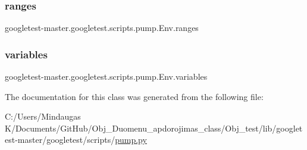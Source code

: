 \subsubsection{\texorpdfstring{ranges}{ranges}}
{\footnotesize\ttfamily googletest-\/master.\+googletest.\+scripts.\+pump.\+Env.\+ranges}

\mbox{\label{classgoogletest-master_1_1googletest_1_1scripts_1_1pump_1_1_env_ab4b8f028f84df234ed81d5c2b57f7303}} 
\subsubsection{\texorpdfstring{variables}{variables}}
{\footnotesize\ttfamily googletest-\/master.\+googletest.\+scripts.\+pump.\+Env.\+variables}



The documentation for this class was generated from the following file\+:\begin{DoxyCompactItemize}
\item 
C\+:/\+Users/\+Mindaugas K/\+Documents/\+Git\+Hub/\+Obj\+\_\+\+Duomenu\+\_\+apdorojimas\+\_\+class/\+Obj\+\_\+test/lib/googletest-\/master/googletest/scripts/\mbox{\hyperlink{_obj__test_2lib_2googletest-master_2googletest_2scripts_2pump_8py}{pump.\+py}}\end{DoxyCompactItemize}
